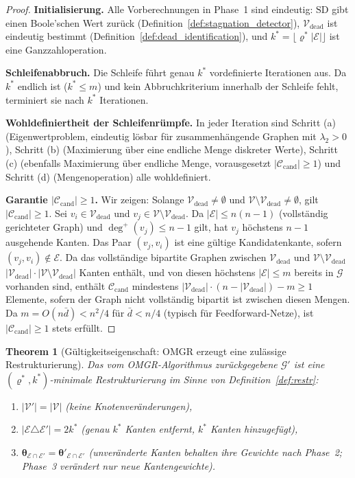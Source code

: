 \documentclass[12pt, a4paper, openany]{report}
\newtheorem{theorem}{Theorem}[chapter]
\newcommand{\calG}{\mathcal{G}}
\newcommand{\calV}{\mathcal{V}}
\newcommand{\calE}{\mathcal{E}}
\newcommand{\calC}{\mathcal{C}}
\begin{document}
\begin{proof}
\textbf{Initialisierung.}
Alle Vorberechnungen in Phase~1 sind eindeutig:
$\mathrm{SD}$ gibt einen Boole'schen Wert zurück (Definition~\ref{def:stagnation_detector}),
$\calV_{\mathrm{dead}}$ ist eindeutig bestimmt (Definition~\ref{def:dead_identification}),
und $k^* = \lfloor\varrho^* |\calE|\rfloor$ ist eine Ganzzahloperation.

\textbf{Schleifenabbruch.}
Die Schleife führt genau $k^*$ vordefinierte Iterationen aus.  Da $k^*$ endlich
ist ($k^* \leq m$) und kein Abbruchkriterium innerhalb der Schleife fehlt,
terminiert sie nach $k^*$ Iterationen.

\textbf{Wohldefiniertheit der Schleifenrümpfe.}
In jeder Iteration sind Schritt (a) (Eigenwertproblem, eindeutig lösbar
für zusammenhängende Graphen mit $\lambda_2 > 0$), Schritt (b) (Maximierung
über eine endliche Menge diskreter Werte), Schritt (c) (ebenfalls Maximierung
über endliche Menge, vorausgesetzt $|\calC_{\mathrm{cand}}| \geq 1$) und
Schritt (d) (Mengenoperation) alle wohldefiniert.

\textbf{Garantie $|\calC_{\mathrm{cand}}| \geq 1$.}
Wir zeigen: Solange $\calV_{\mathrm{dead}} \neq \emptyset$ und
$\calV \setminus \calV_{\mathrm{dead}} \neq \emptyset$, gilt
$|\calC_{\mathrm{cand}}| \geq 1$.
Sei $v_i \in \calV_{\mathrm{dead}}$ und $v_j \in \calV \setminus \calV_{\mathrm{dead}}$.
Da $|\calE| \leq n(n-1)$ (vollständig gerichteter Graph) und
$\deg^+(v_j) \leq n - 1$ gilt, hat $v_j$ höchstens $n-1$ ausgehende
Kanten.  Das Paar $(v_j, v_i)$ ist eine gültige Kandidatenkante,
sofern $(v_j, v_i) \notin \calE$.  Da das vollständige bipartite Graphen
zwischen $\calV_{\mathrm{dead}}$ und $\calV \setminus \calV_{\mathrm{dead}}$
$|\calV_{\mathrm{dead}}| \cdot |\calV \setminus \calV_{\mathrm{dead}}|$
Kanten enthält, und von diesen höchstens $|\calE| \leq m$ bereits in $\calG$
vorhanden sind, enthält $\calC_{\mathrm{cand}}$ mindestens
$|\calV_{\mathrm{dead}}| \cdot (n - |\calV_{\mathrm{dead}}|) - m \geq 1$ Elemente,
sofern der Graph nicht vollständig bipartit ist zwischen diesen Mengen.
Da $m = O(n \bar{d}) < n^2/4$ für $\bar{d} < n/4$ (typisch für
Feedforward-Netze), ist $|\calC_{\mathrm{cand}}| \geq 1$ stets erfüllt.
\end{proof}

\begin{theorem}[Gültigkeitseigenschaft: OMGR erzeugt eine zulässige Restrukturierung]
\label{thm:omgr_validity}
Das vom OMGR-Algorithmus zurückgegebene $\calG'$ ist eine
$(\varrho^*, k^*)$-minimale Restrukturierung im Sinne von
Definition~\ref{def:restr}:
\begin{enumerate}[label=(\alph*)]
  \item $|\calV'| = |\calV|$ \quad (keine Knotenveränderungen),
  \item $|\calE \triangle \calE'| = 2k^*$ \quad (genau $k^*$ Kanten
        entfernt, $k^*$ Kanten hinzugefügt),
  \item $\bm{\theta}_{\calE \cap \calE'} = \bm{\theta}'_{\calE \cap \calE'}$
        \quad (unveränderte Kanten behalten ihre Gewichte nach Phase~2;
        Phase~3 verändert nur neue Kantengewichte).
\end{enumerate}
\end{theorem}
\end{document}
